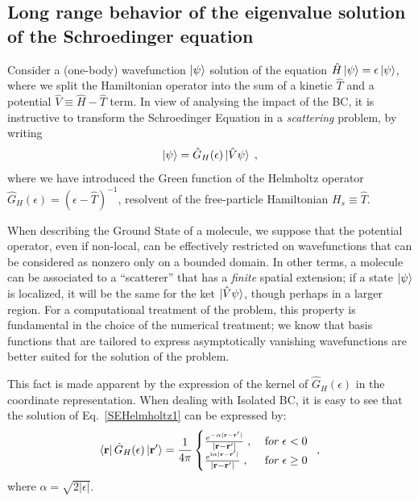 \documentclass[reprint,aps,prb]{revtex4-1}
\renewcommand{\r}{{\bf r}}
\newcommand{\eps}{\epsilon}
\newcommand{\ii}{\mathrm{i}}
\newcommand{\be}{\begin{equation}}
\newcommand{\ee}{\end{equation}}
\newcommand{\lb}{\label}
\newcommand{\op}[1]{\hat {#1}}
\begin{document}
\subsection{Long range behavior of the eigenvalue solution of the Schroedinger equation}
\label{SEopenSystem}
Consider a (one-body) wavefunction $\ket{\psi}$ solution of the equation
$\op H\ket{\psi}=\eps\ket{\psi}$, where we split the Hamiltonian operator into the sum of
a kinetic $\op T$ and a potential $\op V \equiv \op H - \op T$ term.
In view of analysing the impact of the BC, it is instructive to transform 
the Schroedinger Equation in a \emph{scattering} problem, by writing
\be\lb{SEHelmholtz1}
\ket{\psi} = \op G_H(\eps)\ket{\op V\psi}\;,
\ee
where we have introduced the Green function of the Helmholtz operator $\op G_H(\eps) = (\eps-\op T)^{-1}$,
resolvent of the free-particle Hamiltonian $H_s \equiv \op T$.

When describing the Ground State of a molecule, we suppose that the potential operator, even if non-local,
can be effectively restricted on wavefunctions that can be considered as nonzero only on a
bounded domain. In other terms, a molecule can be associated to a ``scatterer'' that has a \emph{finite} 
spatial extension; if a state $\ket{\psi}$ is localized, it will be the same for the ket $\ket{\op V \psi}$, though 
perhaps in a larger region.
For a computational treatment of the problem, this property is fundamental in the 
choice of the numerical treatment; we know that basis functions that are tailored to express asymptotically vanishing 
wavefunctions are better suited for the solution of the problem.

This fact is made apparent by the expression of 
the kernel of $\op G_H(\eps)$ in the coordinate representation. 
When dealing with Isolated BC, it is easy to see that the solution of Eq.~\eqref{SEHelmholtz1}
can be expressed by:
\be\lb{HelmholtzKernelDef1}
\bra{\r} \op G_H(\eps) \ket{\r'} = \frac{1}{4\pi} \begin{cases}
\frac{e^{-\alpha|\r - \r' |}}{|\r- \r' |} \;,\; & {\textrm for}\; \eps  < 0\; \\ 
\frac{e^{\ii \alpha |\r-\r' |}}{|\r-\r' |} \;, & {\textrm for} \; \eps \geq 0
\end{cases} \;,
\ee
where $\alpha = \sqrt{2|\eps|}$. 
\end{document}
